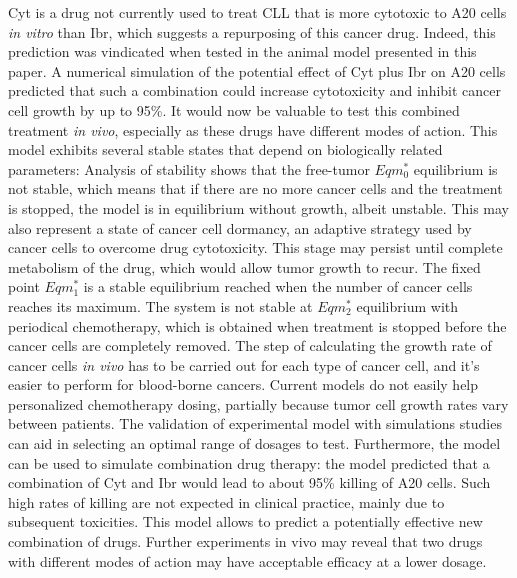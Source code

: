 Cyt is a drug not currently used to treat CLL that is more cytotoxic to A20 cells \textit{in vitro} than Ibr, which suggests a repurposing of this cancer drug. Indeed, this prediction was vindicated when tested in the animal model presented in this paper. 
A numerical simulation of the potential effect of Cyt plus Ibr on A20 cells predicted that such a combination could increase cytotoxicity and inhibit cancer cell growth by up to 95\%. It would now be valuable to test this combined treatment \textit{in vivo}, especially as these drugs have different modes of action. 
This model exhibits several stable states that depend on biologically related parameters: Analysis of stability shows that the free-tumor $Eqm^*_0$ equilibrium is not stable, which means that if there are no more cancer cells and the treatment is stopped, the model is in equilibrium without growth, albeit unstable. This may also represent a state of cancer cell dormancy, an adaptive strategy used by cancer cells to overcome drug cytotoxicity. This stage may persist until complete metabolism of the drug, which would allow tumor growth to recur. 
The fixed point $Eqm^*_1$ is a stable equilibrium reached when the number of cancer cells reaches its maximum. The system is not stable at $Eqm^*_2$ equilibrium with periodical chemotherapy, which is obtained when treatment is stopped before the cancer cells are completely removed.
The step of calculating the growth rate of cancer cells \textit{in vivo} has to be carried out for each type of cancer cell, and it's easier to perform for blood-borne cancers. Current models do not easily help personalized chemotherapy dosing, partially because tumor cell growth rates vary between patients. The validation of experimental model with simulations studies can aid in selecting an optimal range of dosages to test.
Furthermore, the model can be used to simulate combination drug therapy: the model predicted that a combination of Cyt and Ibr would lead to about 95\% killing of A20 cells. Such high rates of killing are not expected in clinical practice, mainly due to subsequent toxicities. This model allows to predict a potentially effective new combination of drugs. Further experiments in vivo may reveal that two drugs with different modes of action may have acceptable efficacy at a lower dosage. 
